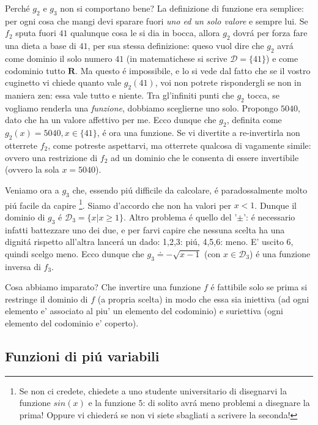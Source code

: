 Perch\'e $g_2$ e $g_3$ non si comportano bene? La definizione di funzione era semplice: per ogni cosa che mangi devi sparare fuori {\em uno ed
un solo valore} e sempre lui. Se $f_2$ sputa fuori $41$ qualunque cosa le si dia in bocca, allora $g_2$ dovr\'a per forza fare una dieta a base di
$41$, per sua stessa definizione: queso vuol dire che $g_2$ avr\'a come dominio il solo numero $41$ (in matematichese si scrive $\mathcal{D}=\{41\}$)
e come codominio tutto $\mathbf{R}$. Ma questo \'e impossibile, e lo si vede dal fatto che se il vostro cuginetto vi chiede quanto vale $g_2(41)$,
voi non potrete rispondergli se non in maniera zen: essa vale tutto e niente. Tra gl'infiniti punti che $g_2$ tocca, se vogliamo renderla una {\em funzione},
dobbiamo sceglierne uno solo. Propongo $5040$, dato che ha un valore affettivo per me. Ecco dunque che $g_2$, definita come $g_2(x)=5040,x \in \{41\}$, \'e
ora una funzione. Se vi divertite a re-invertirla non otterrete $f_2$, come potreste aspettarvi, ma otterrete qualcosa di vagamente simile: ovvero una
restrizione di $f_2$ ad un dominio che le consenta di essere invertibile (ovvero la sola $x=5040$).

Veniamo ora a $g_3$ che, essendo pi\'u difficile da calcolare, \'e paradossalmente molto pi\'u facile da capire \footnote{Se non ci credete,
chiedete a uno studente universitario di disegnarvi la funzione $sin(x)$ e la funzione $5$: di solito avr\'a meno problemi a disegnare la prima!
Oppure vi chieder\'a se non vi siete sbagliati a scrivere la seconda!}. Siamo d'accordo che non ha valori per $x<1$. Dunque il dominio di $g_3$ \'e
$\mathcal{D_3}=\{x | x \ge 1\}$. Altro problema \'e quello del '$\pm$': \'e necessario infatti battezzare uno dei due, e per farvi capire che
nessuna scelta ha una dignit\'a rispetto all'altra lancer\'a un dado: 1,2,3: pi\'u, 4,5,6: meno. E' uscito 6, quindi scelgo meno. Ecco dunque che
$g_3 \doteq -\sqrt{x-1}$ (con $x \in \mathcal{D_3}$) \'e una funzione inversa di $f_3$.

Cosa abbiamo imparato? Che invertire una funzione $f$ \'e fattibile solo se prima si restringe il dominio di $f$ (a propria scelta) in modo che
essa sia iniettiva (ad ogni elemento e' associato al piu' un elemento del codominio) e suriettiva (ogni elemento del codominio e' coperto).

\subsection{Funzioni di pi\'u variabili}

